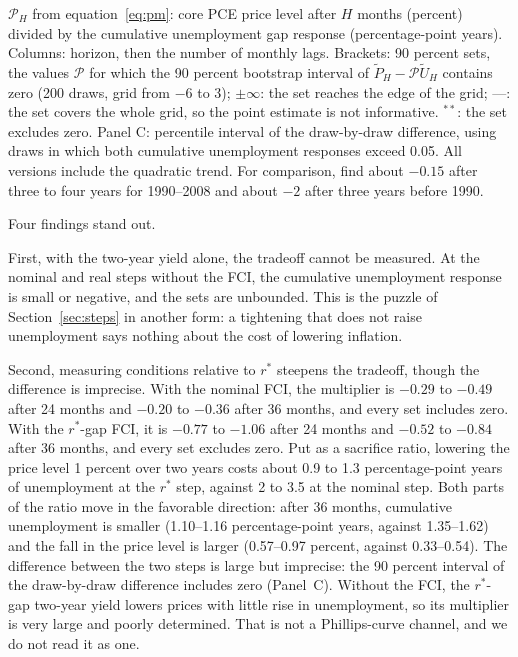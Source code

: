 \documentclass[11pt]{article}
\newcommand{\rs}{r^{*}}
\begin{document}
\begin{table}[H]\centering\small
\caption{The implied tradeoff: Phillips multiplier $\mathcal{P}_H$ (price level per percentage-point year of unemployment)}\label{tab:tradeoff}
{\setlength{\tabcolsep}{4pt}\resizebox{\ifdim\width>\linewidth\linewidth\else\width\fi}{!}{}}
\par\smallskip\begin{minipage}{0.95\textwidth}\footnotesize $\mathcal{P}_H$ from equation~\eqref{eq:pm}: core PCE price level after $H$ months (percent) divided by the cumulative unemployment gap response (percentage-point years). Columns: horizon, then the number of monthly lags. Brackets: 90 percent sets, the values $\mathcal{P}$ for which the 90 percent bootstrap interval of $\tilde P_H-\mathcal{P}\tilde U_H$ contains zero (200 draws, grid from $-6$ to 3); $\pm\infty$: the set reaches the edge of the grid; ---: the set covers the whole grid, so the point estimate is not informative. $^{**}$: the set excludes zero. Panel C: percentile interval of the draw-by-draw difference, using draws in which both cumulative unemployment responses exceed 0.05. All versions include the quadratic trend. For comparison, \citet{barnichon2021} find about $-0.15$ after three to four years for 1990--2008 and about $-2$ after three years before 1990.\end{minipage}
\end{table}

Four findings stand out.

First, with the two-year yield alone, the tradeoff cannot be measured. At the nominal and real steps without the FCI, the cumulative unemployment response is small or negative, and the sets are unbounded. This is the puzzle of Section~\ref{sec:steps} in another form: a tightening that does not raise unemployment says nothing about the cost of lowering inflation.

Second, measuring conditions relative to $\rs$ steepens the tradeoff, though the difference is imprecise. With the nominal FCI, the multiplier is $-0.29$ to $-0.49$ after 24 months and $-0.20$ to $-0.36$ after 36 months, and every set includes zero. With the $\rs$-gap FCI, it is $-0.77$ to $-1.06$ after 24 months and $-0.52$ to $-0.84$ after 36 months, and every set excludes zero. Put as a sacrifice ratio, lowering the price level 1 percent over two years costs about 0.9 to 1.3 percentage-point years of unemployment at the $\rs$ step, against 2 to 3.5 at the nominal step. Both parts of the ratio move in the favorable direction: after 36 months, cumulative unemployment is smaller (1.10--1.16 percentage-point years, against 1.35--1.62) and the fall in the price level is larger (0.57--0.97 percent, against 0.33--0.54). The difference between the two steps is large but imprecise: the 90 percent interval of the draw-by-draw difference includes zero (Panel~C). Without the FCI, the $\rs$-gap two-year yield lowers prices with little rise in unemployment, so its multiplier is very large and poorly determined. That is not a Phillips-curve channel, and we do not read it as one.
\end{document}
